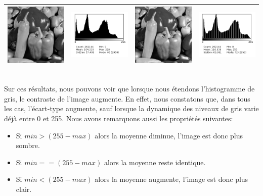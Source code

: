 \documentclass[a4paper,11pt]{article}
\begin{document}
\begin{tabular}{|c|c|c|c|}
   \hline
   \includegraphics[width=3cm]{peppers.png} & \includegraphics[width=3cm]{../histo/image/hist_peppers.png} & \includegraphics[width=3cm]{../res/peppersQ1.png} & \includegraphics[width=3cm]{../histo/resultat/hist_peppersQ1.png}\\
   \hline
  \end{tabular}\\
  
  Sur ces résultats, nous pouvons voir que lorsque nous étendons l'histogramme de gris, le 
  contraste de l'image augmente. En effet, nous constatons que, dans tous les cas, l'écart-type 
  augmente, sauf lorsque la dynamique des niveaux de gris varie déjà entre 0 et 255. Nous 
  avons remarquons aussi les propriétés suivantes:
  
  \begin{itemize}
   \item Si $min>(255-max)$ alors la moyenne diminue, l'image est donc plus sombre.
   \item Si $min==(255-max)$ alors la moyenne reste identique.
   \item Si $min<(255-max)$ alors la moyenne augmente, l'image est donc plus clair.
  \end{itemize}
  
\end{document}

